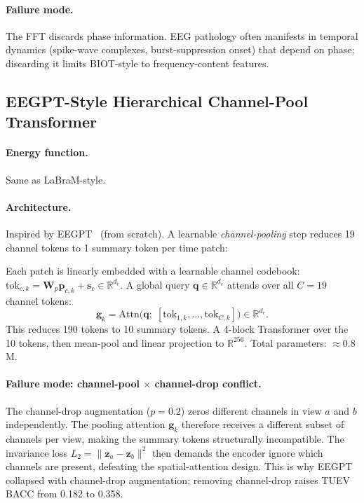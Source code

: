 \documentclass[11pt,a4paper]{article}
\begin{document}
\paragraph{Failure mode.}
The FFT discards phase information.  EEG pathology often manifests in temporal dynamics
(spike-wave complexes, burst-suppression onset) that depend on phase; discarding it limits
BIOT-style to frequency-content features.

\subsection{EEGPT-Style Hierarchical Channel-Pool Transformer}
\label{sec:math_eegpt}

\paragraph{Energy function.} Same as LaBraM-style.

\paragraph{Architecture.}
Inspired by EEGPT~\cite{eegpt} (from scratch).  A learnable \emph{channel-pooling} step
reduces 19 channel tokens to 1 summary token per time patch:

Each patch is linearly embedded with a learnable channel codebook:
$\mathrm{tok}_{c,k} = \mathbf{W}_p\mathbf{p}_{c,k} + \mathbf{s}_c \in \mathbb{R}^{d_e}$.
A global query $\mathbf{q}\in\mathbb{R}^{d_e}$ attends over all $C{=}19$ channel tokens:
\begin{equation}
  \mathbf{g}_k = \mathrm{Attn}\!\bigl(\mathbf{q};\;
    [\mathrm{tok}_{1,k},\ldots,\mathrm{tok}_{C,k}]\bigr)\in\mathbb{R}^{d_e}.
\end{equation}
This reduces 190 tokens to 10 summary tokens.  A 4-block Transformer over the 10 tokens,
then mean-pool and linear projection to $\mathbb{R}^{256}$.
Total parameters: $\approx 0.8$M.

\paragraph{Failure mode: channel-pool $\times$ channel-drop conflict.}
The channel-drop augmentation ($p{=}0.2$) zeros different channels in view $a$ and $b$
independently.  The pooling attention $\mathbf{g}_k$ therefore receives a different
subset of channels per view, making the summary tokens structurally incompatible.
The invariance loss $L_2 = \|\mathbf{z}_a - \mathbf{z}_b\|^2$ then demands the encoder
ignore which channels are present, defeating the spatial-attention design.
This is why EEGPT collapsed with channel-drop augmentation; removing channel-drop
raises TUEV BACC from 0.182 to 0.358.
\end{document}
